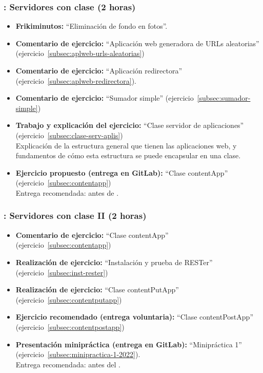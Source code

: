 \documentclass[a4paper,12pt]{article}
\begin{document}
\subsubsection{\martesE: Servidores con clase (2 horas)}
\label{cal:martesE}

\begin{itemize}
\item \textbf{Frikiminutos:} ``Eliminación de fondo en fotos''.
\item \textbf{Comentario de ejercicio:} ``Aplicación web generadora de URLs aleatorias'' (ejercicio~\ref{subsec:aplweb-urls-aleatorias})
\item \textbf{Comentario de ejercicio:} ``Aplicación redirectora'' (ejercicio~\ref{subsec:aplweb-redirectora}).
\item \textbf{Comentario de ejercicio:} ``Sumador simple'' (ejercicio~\ref{subsec:sumador-simple}) 
\item \textbf{Trabajo y explicación del ejercicio:} ``Clase servidor de aplicaciones'' (ejercicio~\ref{subsec:clase-serv-aplis}) \\
  Explicación de la estructura general que tienen las aplicaciones web, y fundamentos de cómo esta estructura se puede encapsular en una clase.
\item \textbf{Ejercicio propuesto (entrega en GitLab):}  ``Clase contentApp'' (ejercicio~\ref{subsec:contentapp}) \\
  Entrega recomendada: antes de \martesF.
\end{itemize}


\subsubsection{\martesF: Servidores con clase II (2 horas)}
\label{cal:martesF}

\begin{itemize}
\item \textbf{Comentario de ejercicio:}  ``Clase contentApp'' (ejercicio~\ref{subsec:contentapp})
\item \textbf{Realización de ejercicio:}  ``Instalación y prueba de RESTer'' (ejercicio~\ref{subsec:inst-rester})
\item \textbf{Realización de ejercicio:}  ``Clase contentPutApp'' (ejercicio~\ref{subsec:contentputapp})
\item \textbf{Ejercicio recomendado (entrega voluntaria):} ``Clase contentPostApp'' (ejercicio~\ref{subsec:contentpostapp})
\item \textbf{Presentación minipráctica (entrega en GitLab):} ``Minipráctica 1'' (ejercicio~\ref{subsec:minipractica-1-2022}). \\
    Entrega recomendada: antes del \martesH.
\end{itemize}
\end{document}

